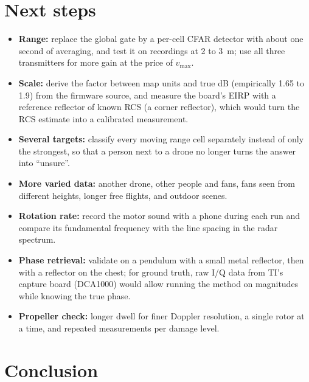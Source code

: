 \documentclass[11pt,a4paper]{article}
\newcommand{\vmax}{v_{\max}}
\begin{document}
\section{Next steps}\label{sec:next}

\begin{itemize}
\item \textbf{Range:} replace the global gate by a per-cell CFAR detector with about one second of averaging, and test it on recordings at 2 to \SI{3}{m}; use all three transmitters for more gain at the price of $\vmax$.
\item \textbf{Scale:} derive the factor between map units and true dB (empirically 1.65 to 1.9) from the firmware source, and measure the board's EIRP with a reference reflector of known RCS (a corner reflector), which would turn the RCS estimate into a calibrated measurement.
\item \textbf{Several targets:} classify every moving range cell separately instead of only the strongest, so that a person next to a drone no longer turns the answer into ``unsure''.
\item \textbf{More varied data:} another drone, other people and fans, fans seen from different heights, longer free flights, and outdoor scenes.
\item \textbf{Rotation rate:} record the motor sound with a phone during each run and compare its fundamental frequency with the line spacing in the radar spectrum.
\item \textbf{Phase retrieval:} validate on a pendulum with a small metal reflector, then with a reflector on the chest; for ground truth, raw I/Q data from TI's capture board (DCA1000) would allow running the method on magnitudes while knowing the true phase.
\item \textbf{Propeller check:} longer dwell for finer Doppler resolution, a single rotor at a time, and repeated measurements per damage level.
\end{itemize}

\section{Conclusion}
\end{document}
